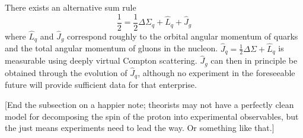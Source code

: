 There exists an alternative sum rule \cite{Jaffe1990509, Ji:1996ek}
%
\begin{equation}
  \frac{1}{2} = \frac{1}{2}\Delta \Sigma_q + \hat{L}_q + \hat{J}_g
\end{equation}
%
where \(\hat{L}_q\) and \(\hat{J}_g\) correspond roughly to the orbital angular momentum of quarks and the total angular momentum of gluons in the nucleon. \(\hat{J}_q = \frac{1}{2}\Delta \Sigma + \hat{L}_q\) is measurable using deeply virtual Compton scattering. \(\hat{J}_g\) can then in principle be obtained through the evolution of \(\hat{J}_q\), although no experiment in the foreseeable future will provide sufficient data for that enterprise.

[End the subsection on a happier note; theorists may not have a perfectly clean model for decomposing the spin of the proton into experimental observables, but the just means experiments need to lead the way.  Or something like that.]